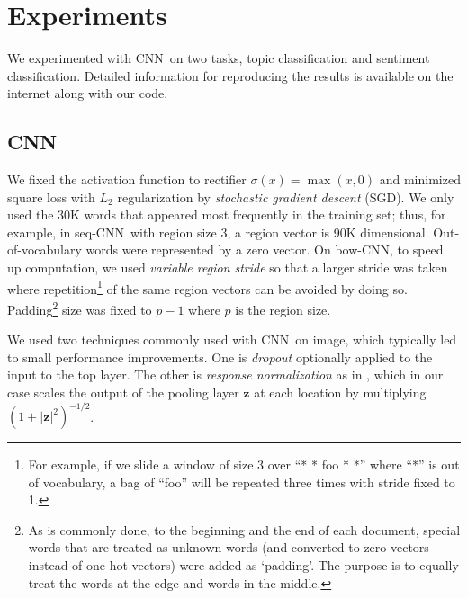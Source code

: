 \documentclass[11pt,letterpaper]{article}
\newcommand{\cnn}{CNN}
\newcommand{\scnn}{seq-CNN}
\newcommand{\bcnn}{bow-CNN}
\newcommand{\bz}{{\mathbf z}}
\newcommand{\activ}{\sigma}
\begin{document}
\section{Experiments}
\label{sec:experiment} 

We experimented with 
\cnn\ on two tasks, topic classification and sentiment classification. 
Detailed information for reproducing the results 
is available on the internet along with our code.  

\subsection{\cnn}


We fixed the activation function to 
rectifier {\small $\activ(x)=\max(x,0)$} and minimized square loss with $L_2$ 
regularization by 
{\em stochastic gradient descent} (SGD).  
We only used the 30K words that appeared most frequently in the training set; 
thus, for example, 
in \scnn\ with region size 3, a region vector is 90K dimensional.  
Out-of-vocabulary words were represented by a zero vector.  
On \bcnn, to speed up computation, 
we used {\em variable region stride} 
so that a larger stride was taken where repetition\footnote{
  For example, if we slide a window of size 3 over ``* * foo * *''
  where ``*'' is out of vocabulary, 
  a bag of ``foo'' will be repeated three times with stride fixed to 1.   
} 
of the same region vectors
can be avoided by doing so.  
Padding\footnote{
  As is commonly done, 
  to the beginning and the end of each document, special words that are treated as unknown words 
  (and converted to zero vectors instead of one-hot vectors) were added as `padding'.
  The purpose is to equally treat the words at the edge and words in the middle.  
}
size was fixed to $p-1$ where $p$ is the region size.  


We used two techniques commonly used with \cnn\ on image, which typically 
led to small performance improvements.  
One is {\em dropout} \cite{dropout12} optionally applied to the input to the top layer.  
The other is {\em response normalization} as in \cite{imagenetNips12}, 
which in our case scales the output of the pooling layer 
$\bz$ at each location by multiplying $(1 + |\bz|^2)^{-1/2}$.  
\end{document}
